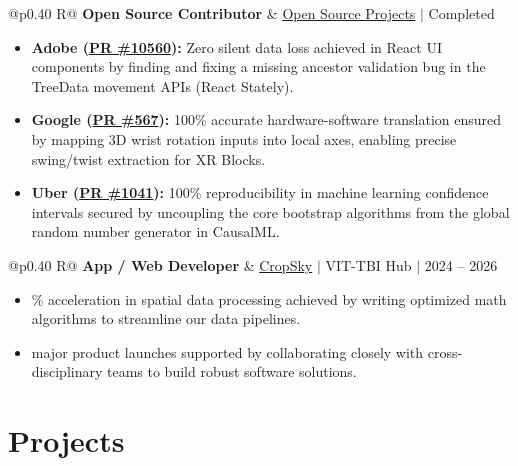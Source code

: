 \documentclass[a4paper,10pt]{article}
\newcommand{\ulink}[2]{\href{#1}{#2}}
\newcommand{\subheading}[1]{{\color[HTML]{0A0A0A}\fontsize{12}{14}\selectfont\bfseries #1}}
\newcommand{\meta}[1]{{\color[HTML]{5C5C5C}\fontsize{10.5}{12.5}\selectfont #1}}
\begin{document}
\begin{tabularx}{\linewidth}{@{}p{0.40\linewidth} R@{}}
\subheading{Open Source Contributor} & \meta{\ulink{https://github.com/su-jin1425/My-Open-Source-Contributions}{Open Source Projects} $|$ Completed}
\end{tabularx}
\begin{itemize}[nosep, leftmargin=1.5em, itemsep=2pt, topsep=2pt]
  \item {\color[HTML]{0A0A0A}\fontsize{11}{14}\selectfont \textbf{Adobe (\ulink{https://github.com/adobe/react-spectrum/pull/10560}{PR \#10560}):} Zero silent data loss achieved in React UI components by finding and fixing a missing ancestor validation bug in the TreeData movement APIs (React Stately).}
  \item {\color[HTML]{0A0A0A}\fontsize{11}{14}\selectfont \textbf{Google (\ulink{https://github.com/google/xrblocks/pull/567}{PR \#567}):} 100\% accurate hardware-software translation ensured by mapping 3D wrist rotation inputs into local axes, enabling precise swing/twist extraction for XR Blocks.}
  \item {\color[HTML]{0A0A0A}\fontsize{11}{14}\selectfont \textbf{Uber (\ulink{https://github.com/uber/causalml/pull/1041}{PR \#1041}):} 100\% reproducibility in machine learning confidence intervals secured by uncoupling the core bootstrap algorithms from the global random number generator in CausalML.}
\end{itemize}

\begin{tabularx}{\linewidth}{@{}p{0.40\linewidth} R@{}}
\subheading{App / Web Developer} & \meta{\ulink{https://sites.google.com/view/cropsky/home}{CropSky} $|$ VIT-TBI Hub $|$ 2024 -- 2026}
\end{tabularx}
\begin{itemize}[nosep, leftmargin=1.5em, itemsep=2pt, topsep=2pt]
  \item {\color[HTML]{0A0A0A}\fontsize{11}{14}\% acceleration in spatial data processing achieved by writing optimized math algorithms to streamline our data pipelines.}
  \item {\color[HTML]{0A0A0A}\fontsize{11}{14} major product launches supported by collaborating closely with cross-disciplinary teams to build robust software solutions.}
\end{itemize}


\section{Projects}
\vspace{2pt}
\end{document}
